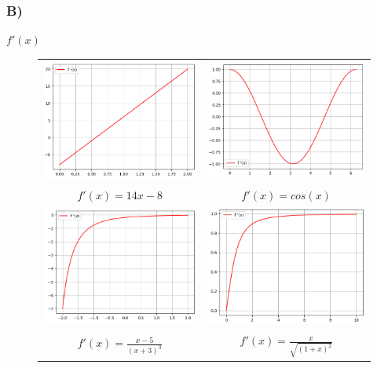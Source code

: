     \subsubsection{B)} $f'(x)$
        \begin{figure}[h!]
            \begin{tabular}{cc}
            \includegraphics[width=75mm]{Figures/del1_2b_1.png} &   \includegraphics[width=75mm]{Figures/del1_2b_2.png} \\
            $f'(x)=14x-8$ & $f'(x)=cos(x)$ \\[6pt]
            \includegraphics[width=75mm]{Figures/del1_2b_3.png} &   \includegraphics[width=75mm]{Figures/del1_2b_4.png} \\
            $f'(x)=\frac{x-5}{(x+3)^{3}}$ & $f'(x)=\frac{x}{\sqrt{(1+x)^{2}}}$ \\[6pt]
            \end{tabular}
        \end{figure}
        \newpage
